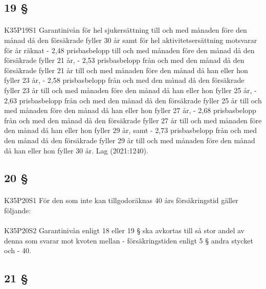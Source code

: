 \documentclass[a4paper,notitlepage,openany,10pt]{book}
\begin{document}
\subsection*{19 §}
\paragraph*{}
{\tiny K35P19S1}
Garantinivån för hel sjukersättning till och med månaden före den månad då den försäkrade fyller 30 år samt för hel aktivitetsersättning motsvarar för år räknat
\newline - 2,48 prisbasbelopp till och med månaden före den månad då den försäkrade fyller 21 år,
\newline - 2,53 prisbasbelopp från och med den månad då den försäkrade fyller 21 år till och med månaden före den månad då han eller hon fyller 23 år,
\newline - 2,58 prisbasbelopp från och med den månad då den försäkrade fyller 23 år till och med månaden före den månad då han eller hon fyller 25 år,
\newline - 2,63 prisbasbelopp från och med den månad då den försäkrade fyller 25 år till och med månaden före den månad då han eller hon fyller 27 år,
\newline - 2,68 prisbasbelopp från och med den månad då den försäkrade fyller 27 år till och med månaden före den månad då han eller hon fyller 29 år, samt
\newline - 2,73 prisbasbelopp från och med den månad då den försäkrade fyller 29 år till och med månaden före den månad då han eller hon fyller 30 år.
Lag (2021:1240).
\subsection*{20 §}
\paragraph*{}
{\tiny K35P20S1}
För den som inte kan tillgodoräknas 40 års försäkringstid gäller följande:
\paragraph*{}
{\tiny K35P20S2}
Garantinivån enligt 18 eller 19 § ska avkortas till så stor andel av denna som svarar mot kvoten mellan - försäkringstiden enligt 5 § andra stycket och
\newline - 40.
\subsection*{21 §}
\end{document}

